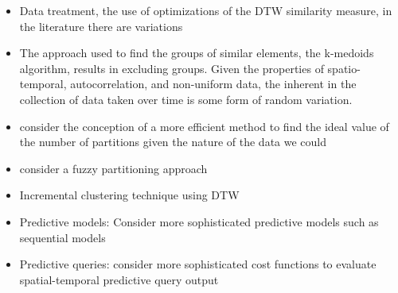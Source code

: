 \begin{itemize}

    \item Data treatment, the use of optimizations of the DTW similarity measure, in the literature there are variations
    \item The approach used to find the groups of similar elements, the k-medoids algorithm, results in excluding groups. Given the properties of spatio-temporal, autocorrelation, and non-uniform data, the inherent in the collection of data taken over time is some form of random variation.
    \item consider the conception of a more efficient method to find the ideal value of the number of partitions given the nature of the data we could
    \item consider a fuzzy partitioning approach
    
    \item Incremental clustering technique using DTW

    \item Predictive models: Consider more sophisticated predictive models such as sequential models

    \item Predictive queries: consider more sophisticated cost functions to evaluate spatial-temporal predictive query output
\end{itemize}

